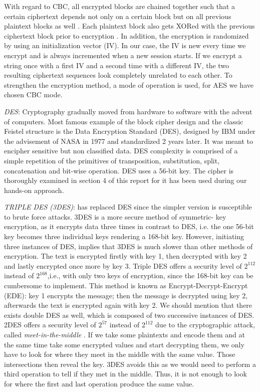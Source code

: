 With regard to CBC, all encrypted blocks are chained together such that a certain ciphertext depends not only on a certain block but on all previous plaintext blocks as well \cite{morris2001}. Each plaintext block also gets XORed with the previous ciphertext block prior to encryption \cite{morris2001}. In addition, the encryption is randomized by using an initialization vector (IV). In our case, the IV is new every time we encrypt and is always incremented when a new session starts. If we encrypt a string once with a first IV and a second time with a different IV, the two resulting ciphertext sequences look completely unrelated to each other. To strengthen the encryption method, a mode of operation is used, for AES we have chosen CBC mode. 

\textit{DES}: Cryptography gradually moved from hardware to software with the advent of computers. Most famous example of the block cipher design and the classic Feistel structure is the Data Encryption Standard (DES), designed by IBM under the advisement of NASA in 1977 and standardized 2 years later. It was meant to encipher sensitive but non classified data. DES complexity is comprised of a simple repetition of the primitives of transposition, substitution, split, concatenation and bit-wise operation. DES uses a 56-bit key. The cipher is thoroughly examined in section 4 of this report for it has been used during our hands-on approach.

\textit{TRIPLE DES (3DES)}: has replaced DES since the simpler version is susceptible to brute force attacks. 3DES is a more secure method of symmetric- key encryption, as it encrypts data three times in contrast to DES, i.e. the one 56-bit key becomes three individual keys rendering a 168-bit key. However, initiating three instances of DES, implies that 3DES is much slower than other methods of encryption. The text is encrypted firstly with key 1, then decrypted with key 2 and lastly encrypted once more by key 3. Triple DES offers a security level of $2^{112}$ instead of $2^{168}$,i.e., with only two keys of encryption, since the 168-bit key can be cumbersome to implement. This method is known as Encrypt-Decrypt-Encrypt (EDE): key 1 encrypts the message; then the message is decrypted using key 2, afterwards the text is encrypted again with key 2. We should mention that there exists double DES as well, which is composed of two successive instances of DES. 2DES offers a security level of $2^{57}$ instead of $2^{112}$ due to the cryptographic attack, called \emph{meet-in-the-middle} \cite{mitm}. If we take some plaintexts and encode them and at the same time take some encrypted values and start decrypting them, we only have to look for where they meet in the middle with the same value. Those intersections then reveal the key. 3DES avoids this as we would need to perform a third operation to tell if they met in the middle. Thus, it is not enough to look for where the first and last operation produce the same value.


